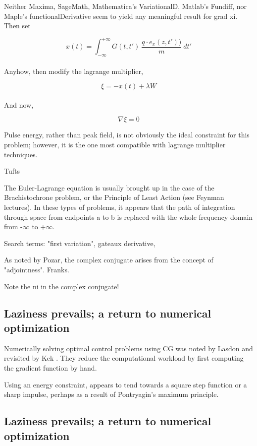 \documentclass[paper.tex]{subfiles}
\begin{document}
Neither Maxima, SageMath, Mathematica's VariationalD, Matlab's Fundiff, nor Maple's 
functionalDerivative seem to yield any meaningful result for grad xi.\\

Then set

$$x(t) = \int_{-\infty}^{+\infty}{G(t,t')\ \frac{q\cdot e_x(z,t'))}{m}\ } dt'$$\\

Anyhow, then modify the lagrange multiplier,

$$\xi = -x(t) + \lambda W$$\\

And now,

$$\nabla \xi = 0$$

Pulse energy, rather than peak field, is not obviously the ideal constraint for this problem; however, it is the one most compatible with lagrange multiplier techniques.

Tufts \cite{Optimum1964}

The Euler-Lagrange equation is usually brought up in the case of the Brachistochrone problem, or 
the Principle of Least Action (see Feynman lectures). In these types of problems, it appears that 
the path of integration through space from endpoints a to b is replaced with the whole frequency 
domain from -$\infty$ to +$\infty$. 

Search terms: "first variation", gateaux derivative, 

As noted by Pozar, the complex conjugate arises from the concept of "adjointness". Franks.

Note the ni in the complex conjugate!


\subsection{Laziness prevails; a return to numerical optimization}

Numerically solving optimal control problems using CG was noted by Lasdon \cite{conjugate1967} and 
revisited by Kek \cite{Conjugate}. They reduce the computational workload by first computing the 
gradient function by hand.

Using an energy constraint, appears to tend towards a square step function or a sharp impulse, perhaps as a result of Pontryagin's maximum principle\cite{Optimum1964}.



\subsection{Laziness prevails; a return to numerical optimization}
\end{document}

